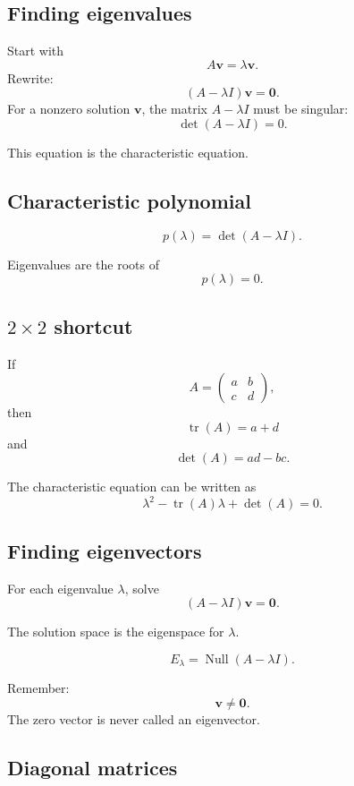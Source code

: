 \subsection*{Finding eigenvalues}

Start with
\[
    A\mathbf v=\lambda\mathbf v.
\]
Rewrite:
\[
    (A-\lambda I)\mathbf v=\mathbf 0.
\]
For a nonzero solution \(\mathbf v\), the matrix \(A-\lambda I\) must be singular:
\[
\boxed{
    \det(A-\lambda I)=0.
}
\]

This equation is the characteristic equation.

\subsection*{Characteristic polynomial}

\[
\boxed{
    p(\lambda)=\det(A-\lambda I).
}
\]

Eigenvalues are the roots of
\[
\boxed{
    p(\lambda)=0.
}
\]

\subsection*{\(2\times2\) shortcut}

If
\[
    A=
    \begin{pmatrix}
    a&b\\
    c&d
    \end{pmatrix},
\]
then
\[
\boxed{
    \operatorname{tr}(A)=a+d
}
\]
and
\[
\boxed{
    \det(A)=ad-bc.
}
\]

The characteristic equation can be written as
\[
\boxed{
    \lambda^2-\operatorname{tr}(A)\lambda+\det(A)=0.
}
\]

\subsection*{Finding eigenvectors}

For each eigenvalue \(\lambda\), solve
\[
\boxed{
    (A-\lambda I)\mathbf v=\mathbf 0.
}
\]

The solution space is the eigenspace for \(\lambda\).

\[
\boxed{
    E_\lambda=\operatorname{Null}(A-\lambda I).
}
\]

Remember:
\[
\boxed{
    \mathbf v\ne\mathbf 0.
}
\]
The zero vector is never called an eigenvector.

\subsection*{Diagonal matrices}

